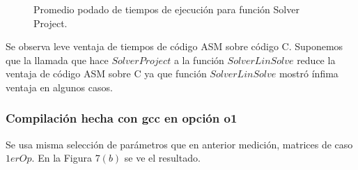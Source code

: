 \begin{figure}[htbp]
\centering


\caption{Promedio podado de tiempos de ejecución para función Solver Project.} \label{fig:lego}
\end{figure}

Se observa leve ventaja de tiempos de código ASM sobre código C. 
Suponemos que la llamada que hace $Solver Project$ a la función $Solver Lin Solve$ reduce la ventaja de código ASM sobre C ya que función $Solver Lin Solve$ mostró ínfima ventaja en algunos casos.


\subsubsection{Compilación hecha con gcc en opción o1}
Se usa misma selección de parámetros que en anterior medición, matrices de caso $1erOp$. En la Figura 7$(b)$ se ve el resultado.
 
